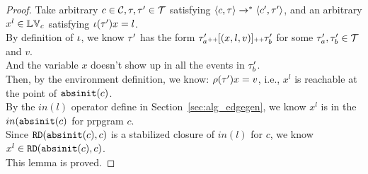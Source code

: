 \begin{proof}
	Take arbitrary $c \in \mathcal{C} , \mathtt{\tau}, \mathtt{\tau}' \in \mathcal{T}$ satisfying 
	$\langle c, \mathtt{\tau} \rangle \xrightarrow{}^* \langle c', \mathtt{\tau}' \rangle$, 
	and an arbitrary $x^l \in \mathbb{LV}_c$ satisfying $\iota(\mathtt{\tau}') x = l$.
	\\
	By definition of $\iota$, we know $\mathtt{\tau}'$ has the form $\mathtt{\tau}'_{a} {\scriptscriptstyle ++} [(x, l, v)] {\scriptscriptstyle ++} \mathtt{\tau}_{b}'$
	for some $\mathtt{\tau}'_{a} , \mathtt{\tau}_{b}' \in \mathcal{T}$ and $v$.
	\\
	And the variable $x$ doesn't show up in all the events in $\mathtt{\tau}_b'$.
%
\\
	Then, by the environment definition, we know:
	$\rho(\mathtt{\tau}') x = v$, i.e., $x^l$ is 
	reachable at the point of 
	$\mathtt{abs}{\mathtt{init}}(c)$.
	\\
	By the $in(l)$ operator define in Section~\ref{sec:alg_edgegen}, we know $x^l$ is in the $in(\mathtt{abs}{\mathtt{init}}(c)$ for prpgram $c$.
	\\
	Since $\mathtt{RD}(\mathtt{abs}{\mathtt{init}}(c), c)$ is a stabilized closure of $in(l)$ for $c$,
	we know 
	$x^l \in \mathtt{RD}(\mathtt{abs}{\mathtt{init}}(c), c)$.
	\\
	This lemma is proved.
\end{proof}